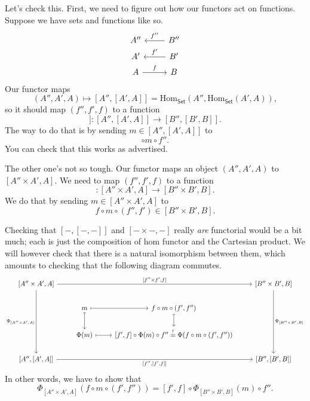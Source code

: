 \documentclass[a4paper,10pt]{scrreprt}
\newcommand{\Hom}{\mathrm{Hom}}
\theoremstyle{definition}
\theoremstyle{plain}
\theoremstyle{remark}
\begin{document}
Let's check this. First, we need to figure out how our functors act on functions. Suppose we have sets and functions like so.
\begin{equation*}
  \begin{tikzcd}[row sep=tiny]
    A''
    & B''
    \arrow[l, swap, "f''"]
    \\
    A'
    & B'
    \arrow[l, swap, "f'"]
    \\
    A 
    \arrow[r, "f"]
    & B
  \end{tikzcd}
\end{equation*}
Our functor maps
\begin{equation*}
  (A'', A', A) \mapsto [A'', [A', A]] = \Hom_{\mathsf{Set}}(A'', \Hom_{\mathsf{Set}}(A', A)),
\end{equation*}
so it should map $(f'', f', f)$ to a function
\begin{equation*}
  [f'', [f', f]]\colon [A'', [A', A]] \to [B'', [B', B]].
\end{equation*}
The way to do that is by sending $m \in [A'', [A', A]]$ to 
\begin{equation*}
  [f', f] \circ m \circ f''.
\end{equation*}
You can check that this works as advertised.

The other one's not so tough. Our functor maps an object $(A'', A', A)$ to $[A'' \times A', A]$. We need to map $(f'', f', f)$ to a function
\begin{equation*}
  [f'' \times f' , f]\colon [A'' \times A', A] \to [B'' \times B', B].
\end{equation*}
We do that by sending $m \in [A'' \times A', A]$ to
\begin{equation*}
  f \circ m \circ (f'', f') \in [B'' \times B', B].
\end{equation*}

Checking that $[-,[-,-]]$ and $[-\times-, -]$ really \emph{are} functorial would be a bit much; each is just the composition of hom functor and the Cartesian product. We will however check that there is a natural isomorphism between them, which amounts to checking that the following diagram commutes.
\begin{equation*}
  \begin{tikzcd}
    {[A'' \times A', A]}
    \arrow[rrr, "{[f'' \times f', f]}"]
    \arrow[ddd, swap, "{\Phi_{[A'' \times A', A]}}"]
    & & & {[B'' \times B', B]}
    \arrow[ddd, "{\Phi_{[B'' \times B', B]}}"]
    \\
    & m
    \arrow[d, mapsto]
    \arrow[r, mapsto]
    & f \circ m \circ (f', f'')
    \arrow[d, mapsto]
    \\
    & \Phi(m)
    \arrow[r, mapsto]
    & {[f', f] \circ \Phi(m) \circ f'' \stackrel{!}{=} \Phi(f \circ m \circ (f', f''))} 
    \\
    {[A'', [A', A]]}
    \arrow[rrr, swap, "{[f'', [f', f]]}"]
    & & & {[B'', [B', B]]}
  \end{tikzcd}
\end{equation*}
In other words, we have to show that 
\begin{equation*}
  \Phi_{[A'' \times A', A]}(f \circ m \circ (f', f'')) = [f', f] \circ \Phi_{[B'' \times B', B]}(m) \circ f''.
\end{equation*}
\end{document}
